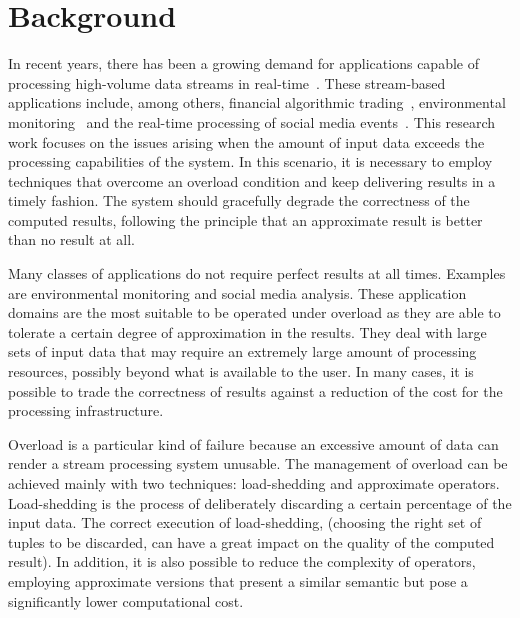 \chapter{Background}
\label{ch:background}

In recent years, there has been a growing demand for applications capable of processing high-volume data
streams in real-time~\cite{8-reqs}. These stream-based applications include, among others, financial
algorithmic trading~\cite{streambase-algo}, environmental monitoring~\cite{swissexp} and the real-time
processing of social media events~\cite{social-networks}.  
This research work focuses on the issues arising when the amount of input data
exceeds the processing capabilities of the system. In this scenario, it is necessary to employ
techniques that overcome an overload condition and keep delivering results in a timely fashion. 
The system should gracefully degrade the correctness
of the computed results, following the principle that an approximate result is better than no
result at all. 

Many classes of applications do not require perfect results at all times. Examples are
environmental monitoring and social media analysis. These application domains are the most suitable to be operated
under overload as they are able to tolerate a certain degree of approximation in the results. They deal
with large sets of input data that may require an extremely large amount of processing resources,
possibly beyond what is available to the user. In many cases, it is possible to trade the correctness of
results against a reduction of the cost for the processing infrastructure.

Overload is a particular kind of failure because an excessive amount of data can render a
stream processing system unusable. The management of overload can be achieved mainly with two
techniques: \mbox{load-shedding} and approximate operators. \mbox{Load-shedding} is the process of
deliberately discarding a certain percentage of the input data. The correct execution of load-shedding,
(\ie choosing the right set of tuples to be discarded, can have a great impact on the quality of the computed result).
In addition, it is also possible to reduce the complexity of operators, employing approximate versions
that present a similar semantic but pose a significantly lower computational cost.




